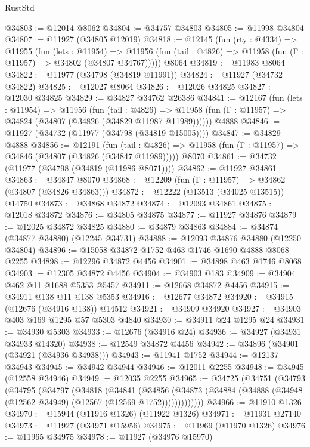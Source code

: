 \begin{lexlean}{RustStd}
\begin{coremodule}
@34803 := @12014 @8062
@34804 := @34757 @34803
@34805 := @11998 @34804
@34807 := @11927 (@34805 @12019)
@34818 := @12145
    (fun (rty : @4334) =>
    @11955
      (fun (lets : @11954) =>
      @11956 (fun (tail : @4826) => @11958 (fun (Γ : @11957) => @34802 (@34807 @34767)))))
    @8064
@34819 := @11983 @8064
@34822 := @11977 (@34798 (@34819 @11991))
@34824 := @11927 (@34732 @34822)
@34825 := @12027 @8064
@34826 := @12026 @34825
@34827 := @12030 @34825
@34829 := @34827 @34762 @26386
@34841 := @12167
    (fun (lets : @11954) =>
    @11956
      (fun (tail : @4826) =>
      @11958 (fun (Γ : @11957) => @34824 (@34807 (@34826 (@34829 @11987 @11989))))))
    @4888
@34846 := @11927 (@34732 (@11977 (@34798 (@34819 @15005))))
@34847 := @34829 @4888
@34856 := @12191
    (fun (tail : @4826) => @11958 (fun (Γ : @11957) => @34846 (@34807 (@34826 (@34847 @11989)))))
    @8070
@34861 := @34732 (@11977 (@34798 (@34819 (@11986 @8071))))
@34862 := @11927 @34861
@34863 := @34847 @8070
@34868 := @12209 (fun (Γ : @11957) => @34862 (@34807 (@34826 @34863)))
@34872 := @12222 (@13513 (@34025 @13515)) @14750
@34873 := @34868 @34872
@34874 := @12093 @34861
@34875 := @12018 @34872
@34876 := @34805 @34875
@34877 := @11927 @34876
@34879 := @12025 @34872 @34825
@34880 := @34879 @34863
@34884 := @34874 (@34877 @34880) (@12245 @34731)
@34888 := @12093 @34876 @34880 (@12250 @34804)
@34896 := @15058 @34872 @1752 @463 @1746 @1690 @4888 @8068 @2255
@34898 := @12296 @34872 @4456
@34901 := @34898 @463 @1746 @8068
@34903 := @12305 @34872 @4456
@34904 := @34903 @183
@34909 := @34904 @462 @11 @1688 @5353 @5457
@34911 := @12668 @34872 @4456
@34915 := @34911 @138 @11 @138 @5353
@34916 := @12677 @34872
@34920 := @34915 (@12676 (@34916 @138)) @14512
@34921 := @34909 @34920
@34927 := @34903 @403 @169 @1295 @57 @5303 @4840
@34930 := @34911 @24 @1295 @24
@34931 := @34930 @5303
@34933 := @12676 (@34916 @24)
@34936 := @34927 (@34931 @34933 @14320)
@34938 := @12549 @34872 @4456
@34942 := @34896 (@34901 (@34921 (@34936 @34938)))
@34943 := @11941 @1752
@34944 := @12137 @34943
@34945 := @34942 @34944
@34946 := @12011 @2255
@34948 := @34945 (@12558 @34946)
@34949 := @12035 @2255
@34965 := @34725
    (@34751
      (@34793
        (@34795
          (@34797
            (@34818
              (@34841
                (@34856
                  (@34873 (@34884 (@34888 (@34948 (@12562 @34949) (@12567 (@12569 @1752)))))))))))))
@34966 := @11910 @1326
@34970 := @15944 (@11916 @1326) (@11922 @1326)
@34971 := @11931 @27140
@34973 := @11927 (@34971 @15956)
@34975 := @11969 (@11970 @1326)
@34976 := @11965 @34975
@34978 := @11927 (@34976 @15970)

\end{coremodule}
\end{lexlean}
